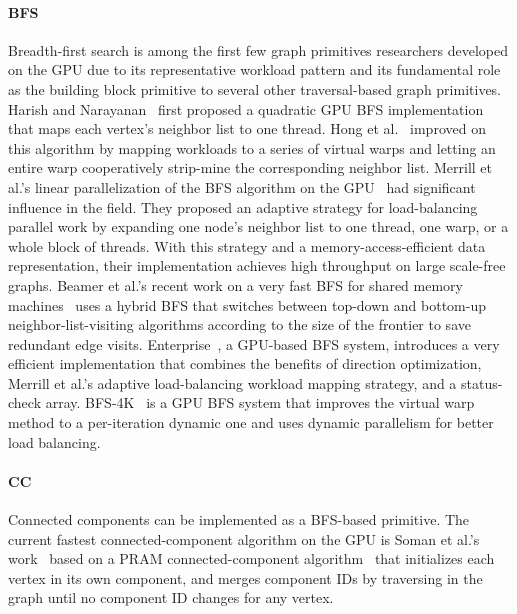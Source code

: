 \documentclass[format=acmsmall,review=false,screen=true]{acmart}
\begin{document}
\paragraph{BFS} Breadth-first search is among the first few graph
primitives researchers developed on the GPU due to its representative
workload pattern and its fundamental role as the building block
primitive to several other traversal-based graph primitives. Harish
and Narayanan~ first proposed a quadratic
GPU BFS implementation that maps each vertex's neighbor list to one
thread. Hong et al.~ improved on this
algorithm by mapping workloads to a series of virtual warps and
letting an entire warp cooperatively strip-mine the corresponding
neighbor list. Merrill et al.'s linear parallelization of the BFS
algorithm on the GPU~\cite{Merrill:2012:SGG} had significant influence
in the field. They proposed an adaptive strategy for load-balancing
parallel work by expanding one node's neighbor list to one thread, one
warp, or a whole block of threads. With this strategy and a
memory-access-efficient data representation, their implementation
achieves high throughput on large scale-free graphs. Beamer et al.'s
recent work on a very fast BFS for shared memory
machines~\cite{Beamer:2012:DBS} uses a hybrid BFS that switches
between top-down and bottom-up neighbor-list-visiting algorithms
according to the size of the frontier to save redundant edge visits.
Enterprise~\cite{Liu:2015:EBG}, a GPU-based BFS system, introduces a
very efficient implementation that combines the benefits of direction
optimization, Merrill et al.'s adaptive load-balancing workload
mapping strategy, and a status-check array.
BFS-4K~\cite{Busato:2015:BAE} is a GPU BFS system that improves the
virtual warp method to a per-iteration dynamic one and uses dynamic
parallelism for better load balancing.

\paragraph{CC} Connected components can be implemented as a BFS-based
primitive. The current fastest connected-component algorithm on the
GPU is Soman et al.'s work~ based on a PRAM
connected-component algorithm~\cite{Greiner:1994:CPA} that initializes
each vertex in its own component, and merges component IDs by
traversing in the graph until no component ID changes for any vertex.
\end{document}
